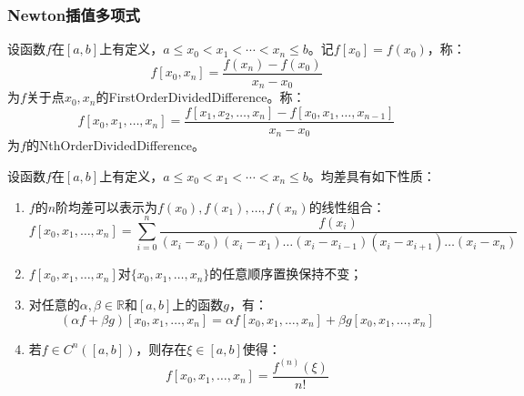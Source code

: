 \subsubsection{Newton插值多项式}
\begin{definition}
	设函数$f$在$[a,b]$上有定义，$a\leqslant x_0<x_1<\cdots<x_n\leqslant b$。记$f[x_0]=f(x_0)$，称：
	\begin{equation*}
		f[x_0,x_n]=\frac{f(x_n)-f(x_0)}{x_n-x_0}
	\end{equation*}
	为$f$关于点$x_0,x_n$的\gls{FirstOrderDividedDifference}。称：
	\begin{equation*}
		f[x_0,x_1,\dots,x_n]=\frac{f[x_1,x_2,\dots,x_n]-f[x_0,x_1,\dots,x_{n-1}]}{x_n-x_0}
	\end{equation*}
	为$f$的\gls{NthOrderDividedDifference}。
\end{definition}
\begin{property}\label{prop:DividedDifference}
	设函数$f$在$[a,b]$上有定义，$a\leqslant x_0<x_1<\cdots<x_n\leqslant b$。均差具有如下性质：
	\begin{enumerate}
		\item $f$的$n$阶均差可以表示为$f(x_0),f(x_1),\dots,f(x_n)$的线性组合：
		\begin{equation*}
			f[x_0,x_1,\dots,x_n]=\sum_{i=0}^{n}\frac{f(x_i)}{(x_i-x_0)(x_i-x_1)\dots(x_i-x_{i-1})(x_i-x_{i+1})\dots(x_i-x_n)}
		\end{equation*}
		\item $f[x_0,x_1,\dots,x_n]$对$\{x_0,x_1,\dots,x_n\}$的任意顺序置换保持不变；
		\item 对任意的$\alpha,\beta\in\mathbb{R}$和$[a,b]$上的函数$g$，有：
		\begin{equation*}
			(\alpha f+\beta g)[x_0,x_1,\dots,x_n]=\alpha f[x_0,x_1,\dots,x_n]+\beta g[x_0,x_1,\dots,x_n]
		\end{equation*}
		\item 若$f\in C^n([a,b])$，则存在$\xi\in[a,b]$使得：
		\begin{equation*}
			f[x_0,x_1,\dots,x_n]=\frac{f^{(n)}(\xi)}{n!}
		\end{equation*}
	\end{enumerate}
\end{property}
